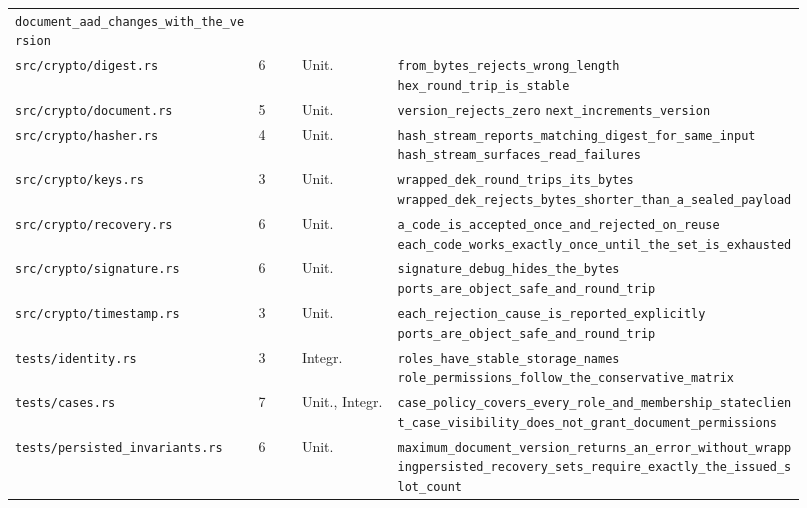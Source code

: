 \begin{longtable}{@{}L{0.285\linewidth}C{0.05\linewidth}L{0.115\linewidth}L{0.47\linewidth}@{}}
    \texttt{document\_aad\_changes\_with\_the\_version} \\
  \texttt{src/crypto/\allowbreak{}digest.rs} & 6 & Unit. & \texttt{from\_bytes\_rejects\_wrong\_length}\newline
    \texttt{hex\_round\_trip\_is\_stable} \\
  \texttt{src/crypto/\allowbreak{}document.rs} & 5 & Unit. & \texttt{version\_rejects\_zero}\newline
    \texttt{next\_increments\_version} \\
  \texttt{src/crypto/\allowbreak{}hasher.rs} & 4 & Unit. & \texttt{hash\_stream\_reports\_matching\_digest\_for\_same\_input}\newline
    \texttt{hash\_stream\_surfaces\_read\_failures} \\
  \texttt{src/crypto/\allowbreak{}keys.rs} & 3 & Unit. & \texttt{wrapped\_dek\_round\_trips\_its\_bytes}\newline
    \texttt{wrapped\_dek\_rejects\_bytes\_shorter\_than\_a\_sealed\_payload} \\
  \texttt{src/crypto/\allowbreak{}recovery.rs} & 6 & Unit. & \texttt{a\_code\_is\_accepted\_once\_and\_rejected\_on\_reuse}\newline
    \texttt{each\_code\_works\_exactly\_once\_until\_the\_set\_is\_exhausted} \\
  \texttt{src/crypto/\allowbreak{}signature.rs} & 6 & Unit. & \texttt{signature\_debug\_hides\_the\_bytes}\newline
    \texttt{ports\_are\_object\_safe\_and\_round\_trip} \\
  \texttt{src/crypto/\allowbreak{}timestamp.rs} & 3 & Unit. & \texttt{each\_rejection\_cause\_is\_reported\_explicitly}\newline
    \texttt{ports\_are\_object\_safe\_and\_round\_trip} \\
  \texttt{tests/identity.rs} & 3 & Integr. & \texttt{roles\_have\_stable\_storage\_names}\newline
    \texttt{role\_permissions\_follow\_the\_conservative\_matrix} \\
  \texttt{tests/\allowbreak{}cases.rs} & 7 & Unit., Integr. & \texttt{case\_policy\_covers\_every\_role\_and\_membership\_state}\newline\texttt{client\_case\_visibility\_does\_not\_grant\_document\_permissions} \\
  \texttt{tests/\allowbreak{}persisted\_invariants.rs} & 6 & Unit. & \texttt{maximum\_document\_version\_returns\_an\_error\_without\_wrapping}\newline\texttt{persisted\_recovery\_sets\_require\_exactly\_the\_issued\_slot\_count} \\

\end{longtable}
